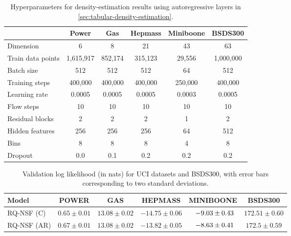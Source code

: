 \begin{table}[!h]
	\caption{Hyperparameters for density-estimation results using autoregressive layers in \cref{sec:tabular-density-estimation}.}
	\label{tab:experimental-details-density-estimation-autoregressive}
	\vspace*{-0.1in}
	\begin{center}
		\begin{small}
			\begin{sc}
				\begin{tabular}{lccccc}
					\toprule
					& Power & Gas & Hepmass & Miniboone & BSDS300 \\ 
					\midrule
					Dimension & 6 & 8 & 21 & 43 & 63 \\
					Train data points & 1,615,917 & 852,174 & 315,123 & 29,556 & 1,000,000 \\
					\midrule
					Batch size & 512 & 512 & 512 & 64 & 512 \\
					Training steps & 400,000 & 400,000 & 400,000 & 250,000 & 400,000 \\
					Learning rate & 0.0005 & 0.0005 & 0.0005 & 0.0003 & 0.0005 \\
					Flow steps & 10 & 10 & 10 & 10 & 10 \\
					Residual blocks & 2 & 2 & 2 & 1 & 2 \\
					Hidden features & 256 & 256 & 256 & 64 & 512 \\
					Bins & 8 & 8 & 8 & 4 & 8 \\
					Dropout & 0.0 & 0.1 & 0.2 & 0.2 & 0.2 \\
					\bottomrule
				\end{tabular}
			\end{sc}
		\end{small}
	\end{center}
\end{table}

\begin{table}[!h]
	\caption{Validation log likelihood (in nats) for UCI datasets and BSDS300, with error bars corresponding to two standard deviations.}
	\label{tab:uci-results-validation}
        \vspace*{-0.1in}
	\begin{center}
		\begin{small}
			\begin{sc}
				\begin{tabular}{lccccc}
					\toprule
					Model & POWER & GAS & HEPMASS & MINIBOONE & BSDS300 \\ 
					\midrule
					RQ-NSF (C) & $ 0.65 \pm 0.01 $ & $ 13.08 \pm 0.02 $ & $ -14.75 \pm 0.06 $ & $ \hphantom{0}{-9.03} \pm 0.43 $ & $ 172.51 \pm 0.60 $  \\
					RQ-NSF (AR) & $ 0.67 \pm 0.01 $ & $ 13.08 \pm 0.02 $ & $ -13.82 \pm 0.05 $ & $ \hphantom{0}{-8.63} \pm 0.41 $ & $ 172.5 \pm 0.59 $ \\
					\bottomrule
				\end{tabular}
			\end{sc}
		\end{small}
	\end{center}
	\vspace{-1.0em}
\end{table}

